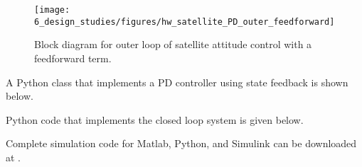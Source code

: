 \begin{figure}[hbt]
  \centering\texttt{[image: 6\_design\_studies/figures/hw\_satellite\_PD\_outer\_feedforward]}
  \caption{Block diagram for outer loop of satellite attitude control with a feedforward term.}
  \label{fig:hw_satellite_PD_outer_feedforward} 
\end{figure}

A Python class that implements a PD controller using state feedback is shown below.


Python code that implements the closed loop system is given below.


Complete simulation code for Matlab, Python, and Simulink can be downloaded at .
	
%

%


